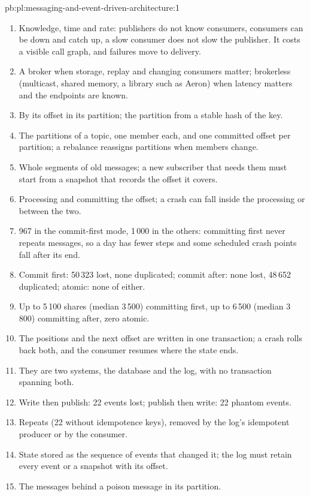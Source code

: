 \begin{solution}{pb:pl:messaging-and-event-driven-architecture:1}
\begin{enumerate}
\item Knowledge, time and rate: publishers do not know consumers, consumers can be down and catch up, a slow consumer does not slow the
publisher. It costs a visible call graph, and failures move to delivery.
\item A broker when storage, replay and changing consumers matter; brokerless (multicast, shared memory, a library such as Aeron) when latency
matters and the endpoints are known.
\item By its offset in its partition; the partition from a stable hash of the key.
\item The partitions of a topic, one member each, and one committed offset per partition; a rebalance reassigns partitions when members change.
\item Whole segments of old messages; a new subscriber that needs them must start from a snapshot that records the offset it covers.
\item Processing and committing the offset; a crash can fall inside the processing or between the two.
\item 967 in the commit-first mode, 1\,000 in the others: committing first never repeats messages, so a day has fewer steps and some scheduled
crash points fall after its end.
\item Commit first: 50\,323 lost, none duplicated; commit after: none lost, 48\,652 duplicated; atomic: none of either.
\item Up to 5\,100 shares (median 3\,500) committing first, up to 6\,500 (median 3\,800) committing after, zero atomic.
\item The positions and the next offset are written in one transaction; a crash rolls back both, and the consumer resumes where the state
ends.
\item They are two systems, the database and the log, with no transaction spanning both.
\item Write then publish: 22 events lost; publish then write: 22 phantom events.
\item Repeats (22 without idempotence keys), removed by the log's idempotent producer or by the consumer.
\item State stored as the sequence of events that changed it; the log must retain every event or a snapshot with its offset.
\item The messages behind a poison message in its partition.

\end{enumerate}
\end{solution}

